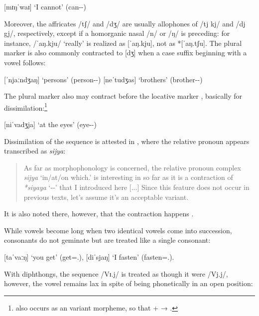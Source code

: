 \ex
	 [mɪŋˈwaɪ] `I cannot' (can-\Neg{}-\Fsg{})
\xe

Moreover, the affricates /tʃ/ and /dʒ/ are usually allophones of /tj kj/ and 
/dj gj/, respectively, except if a homorganic nasal /n/ or /ŋ/ is preceding: 
for instance,  /ˈaŋ.kju/ `really' is realized as [ˈaŋ.kju], 
not as *[ˈaŋ.tʃu]. The plural marker  is also commonly 
contracted to [dʒ] when a case suffix beginning with a vowel follows:

\pex
	\a {} [ˈnjaːndʒaŋ] `persons' (person-\Pl{}-\Aarg{})
	\a {} [neˈtudʒas] `brothers' (brother-\Pl{}-\Parg{})
\xe

The plural marker also may contract before the locative marker , 
basically for dissimilation:\footnote{ also occurs as an 
variant morpheme, so that  +  → 
.}

\ex
	 [niˈvadʒja] `at the eyes' (eye-\Pl{}-\Loc{})
\xe

Dissimilation of the sequence  is attested in 
\citet[12]{becker:kafka:imperial}, where the relative pronoun 
 appears transcribed as \textit{sijya}:

\begin{quote}
As far as morphophonology is concerned, the relative pronoun complex 
\textit{sijya} `in/at/on which.\Loc{}' is interesting in so far as it is a 
contraction of \textit{*siyaya} `\Rel{}-\Loc{}-\Loc{}' that I introduced here
[...] Since this feature does not occur in previous texts, let's assume it's an 
acceptable variant.
\end{quote}

\noindent It is also noted there, however, that the contraction happens 
.

While vowels become long when two identical vowels come into succession,  
consonants do not geminate but are treated like a single consonant:

\pex
	\a {} [taˈvaːŋ] `you get' (get=\Ssg{}.\Aarg{}),
	\a {} [diˈsjaŋ] `I fasten' (fasten=\Fsg{}.\Aarg{}).
\xe

\noindent With diphthongs, the sequence /Vɪ.j/ is treated as though it were 
/Vj.j/, however, the vowel remains lax in spite of being phonetically in an 
open position:

